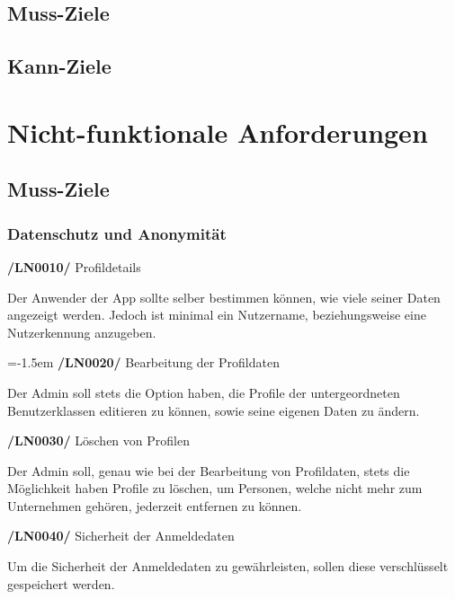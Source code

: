 \documentclass[11pt,a4paper]{report}
\begin{document}
\subsection{Muss-Ziele}

\subsection{Kann-Ziele}
\newpage

\section{Nicht-funktionale Anforderungen}
\subsection{Muss-Ziele}
\subsubsection{Datenschutz und Anonymität}
\textbf{/LN0010/} Profildetails
\par
\begingroup
\leftskip=1cm
\noindent Der Anwender der App sollte selber bestimmen können, wie viele seiner Daten angezeigt werden. Jedoch ist minimal ein Nutzername, beziehungsweise eine Nutzerkennung anzugeben.\\
\par
\endgroup

\leftskip=-1.5em
\textbf{/LN0020/} Bearbeitung der Profildaten
\par
\begingroup
\leftskip=1cm
\noindent Der Admin soll stets die Option haben, die Profile der untergeordneten Benutzerklassen editieren zu können, sowie seine eigenen Daten zu ändern.\\
\par
\endgroup

\textbf{/LN0030/} Löschen von Profilen
\par
\begingroup
\leftskip=1cm
\noindent Der Admin soll, genau wie bei der Bearbeitung von Profildaten, stets die Möglichkeit haben Profile zu löschen, um Personen, welche nicht mehr zum Unternehmen gehören, jederzeit entfernen zu können.\\
\par
\endgroup

\textbf{/LN0040/} Sicherheit der Anmeldedaten
\par
\begingroup
\leftskip=1cm
\noindent Um die Sicherheit der Anmeldedaten zu gewährleisten, sollen diese verschlüsselt gespeichert werden.\\
\par
\endgroup
\end{document}
